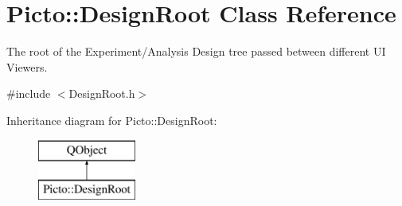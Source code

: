 \hypertarget{class_picto_1_1_design_root}{\section{Picto\-:\-:Design\-Root Class Reference}
\label{class_picto_1_1_design_root}
}


The root of the Experiment/\-Analysis Design tree passed between different U\-I Viewers.  




{\ttfamily \#include $<$Design\-Root.\-h$>$}

Inheritance diagram for Picto\-:\-:Design\-Root\-:\begin{figure}[H]
\begin{center}
\leavevmode
\includegraphics[height=2.000000cm]{class_picto_1_1_design_root}
\end{center}
\end{figure}
